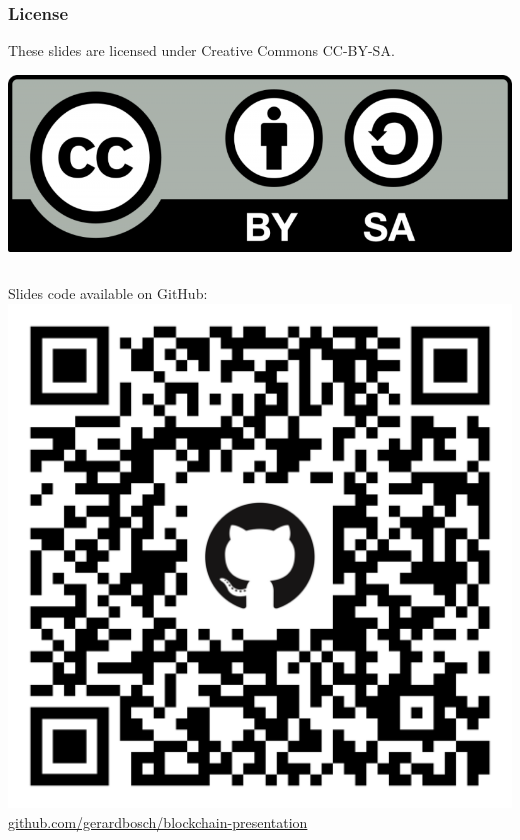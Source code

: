 \documentclass[notitlepage, usenames,dvipsnames]{beamer}
\begin{document}
    \begin{frame}
        \frametitle{License}

        These slides are licensed under Creative Commons CC-BY-SA.

        \begin{center}\includegraphics[scale=0.1]{../img/cc-by-sa.png}\end{center}

        
        \vspace{2ex}
        \begin{columns}
            \centering
            Slides code available on GitHub: \\[1ex]
            \includegraphics[scale=0.06]{../img/github-repo.png} \\
            \tiny \href{https://github.com/gerardbosch/blockchain-presentation}{github.com/gerardbosch/blockchain-presentation}
        

\end{columns}
\end{frame}
\end{document}
